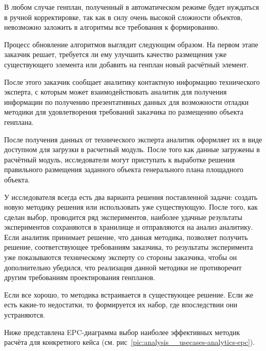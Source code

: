 В любом случае генплан, полученный в автоматическом режиме будет нуждаться в ручной корректировке,
так как в силу очень высокой сложности объектов, невозможно заложить в алгоритмы все требования к формированию.

Процесс обновление алгоритмов выглядит следующим образом.
На первом этапе заказчик решает, требуется ли ему улучшить качество размещения уже существующего элемента
или добавить на генплан новый расчётный элемент.

После этого заказчик сообщает аналитику контактную информацию технического эксперта, с которым может взаимодействовать
аналитик для получения информации по получению презентативных данных для возможности отладки методики
для удовлетворения требований заказчика по размещению объекта генплана.

После получения данных от технического эксперта аналитик оформляет их в виде доступном для загрузки в расчетный модуль.
После того как данные загружены в расчётный модуль, исследователи могут приступать к выработке решения
правильного размещения заданного объекта генерального плана площадного объекта.

У исследователя всегда есть два варианта решения поставленной задачи: создать новую методику решения
или использовать уже существующую.
После того, как сделан выбор, проводится ряд экспериментов,
наиболее удачные результаты экспериментов сохраняются в хранилище и отправляются на анализ аналитику.
Если аналитик принимает решение, что данная методика, позволяет получить решение, соответствующее требованиям
заказчика, то результаты эксперимента уже показываются техническому эксперту со стороны заказчика,
чтобы он дополнительно убедился, что реализация данной методики не противоречит другим требованиям
проектирования генпланов.

Если все хорошо, то методика встраивается в существующее решение. Если же есть какие-то недостатки, то формируется
их набор, где впоследствии они устраняются.

Ниже представлена EPC-диаграмма выбор наиболее эффективных методик расчёта для конкретного кейса
(см. рис\ \ref{pic:analysis__usecases-analytics-epc}).

